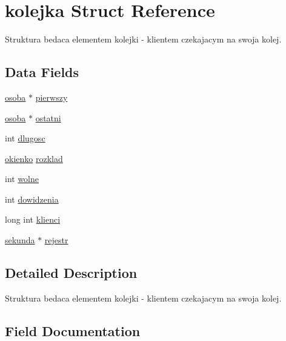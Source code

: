 \hypertarget{structkolejka}{}\section{kolejka Struct Reference}
\label{structkolejka}


Struktura bedaca elementem kolejki -\/ klientem czekajacym na swoja kolej.  


\subsection*{Data Fields}
\begin{DoxyCompactItemize}
\item 
\hyperlink{structosoba}{osoba} $\ast$ \hyperlink{structkolejka_a4d248304c78ad2a38974f8c5b71c4c7c}{pierwszy}
\item 
\hyperlink{structosoba}{osoba} $\ast$ \hyperlink{structkolejka_a73379228b3b1b4b9e4646f176550df7e}{ostatni}
\item 
int \hyperlink{structkolejka_a97085701621cb4ae96ca2b284fc4a830}{dlugosc}
\item 
\hyperlink{structokienko}{okienko} \hyperlink{structkolejka_a6bf1b7b72ca4ecdd0436f324eb093e21}{rozklad}
\item 
int \hyperlink{structkolejka_aadcbb166e915b47c745827535abc3a9f}{wolne}
\item 
int \hyperlink{structkolejka_a1ed9b914e525025c5ac4bdfdfde4ce15}{dowidzenia}
\item 
long int \hyperlink{structkolejka_a903fe5525d677f3a47dcb4b07cd61864}{klienci}
\item 
\hyperlink{structsekunda}{sekunda} $\ast$ \hyperlink{structkolejka_a513e21be1be6b9960e90cadd19d49e47}{rejestr}
\end{DoxyCompactItemize}


\subsection{Detailed Description}
Struktura bedaca elementem kolejki -\/ klientem czekajacym na swoja kolej. 

\subsection{Field Documentation}
\mbox{\label{structkolejka_a97085701621cb4ae96ca2b284fc4a830}} 
